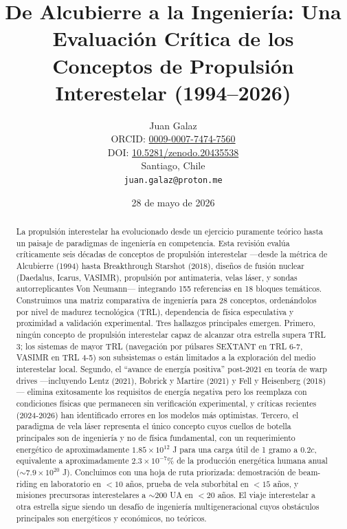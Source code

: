 \documentclass[11pt,a4paper,onecolumn]{article}
\title{{\bfseries De Alcubierre a la Ingeniería: Una Evaluación Crítica de los Conceptos de Propulsión Interestelar (1994--2026)}}
\author{Juan Galaz\\[2mm]
\small ORCID: \href{https://orcid.org/0009-0007-7474-7560}{0009-0007-7474-7560}\\
\small DOI: \href{https://doi.org/10.5281/zenodo.20435538}{10.5281/zenodo.20435538}\\
\small Santiago, Chile\\
\small \texttt{juan.galaz@proton.me}}
\date{28 de mayo de 2026}
\begin{document}
\maketitle

\begin{abstract}
La propulsión interestelar ha evolucionado desde un ejercicio puramente teórico hasta un paisaje de paradigmas de ingeniería en competencia. Esta revisión evalúa críticamente seis décadas de conceptos de propulsión interestelar —desde la métrica de Alcubierre (1994) hasta Breakthrough Starshot (2018), diseños de fusión nuclear (Daedalus, Icarus, VASIMR), propulsión por antimateria, velas láser, y sondas autorreplicantes Von Neumann— integrando 155 referencias en 18 bloques temáticos. Construimos una matriz comparativa de ingeniería para 28 conceptos, ordenándolos por nivel de madurez tecnológica (TRL), dependencia de física especulativa y proximidad a validación experimental. Tres hallazgos principales emergen. Primero, ningún concepto de propulsión interestelar capaz de alcanzar otra estrella supera TRL 3; los sistemas de mayor TRL (navegación por púlsares SEXTANT en TRL 6-7, VASIMR en TRL 4-5) son subsistemas o están limitados a la exploración del medio interestelar local. Segundo, el ``avance de energía positiva'' post-2021 en teoría de warp drives —incluyendo Lentz (2021), Bobrick y Martire (2021) y Fell y Heisenberg (2018)— elimina exitosamente los requisitos de energía negativa pero los reemplaza con condiciones físicas que permanecen sin verificación experimental, y críticas recientes (2024-2026) han identificado errores en los modelos más optimistas. Tercero, el paradigma de vela láser representa el único concepto cuyos cuellos de botella principales son de ingeniería y no de física fundamental, con un requerimiento energético de aproximadamente $1.85\times10^{12}$ J para una carga útil de 1 gramo a $0.2c$, equivalente a aproximadamente $2.3\times10^{-7}$\% de la producción energética humana anual ($\sim7.9\times10^{20}$ J). Concluimos con una hoja de ruta priorizada: demostración de beam-riding en laboratorio en $<10$ años, prueba de vela suborbital en $<15$ años, y misiones precursoras interestelares a $\sim200$ UA en $<20$ años. El viaje interestelar a otra estrella sigue siendo un desafío de ingeniería multigeneracional cuyos obstáculos principales son energéticos y económicos, no teóricos.
\end{abstract}

\vspace{5mm}

\end{document}
